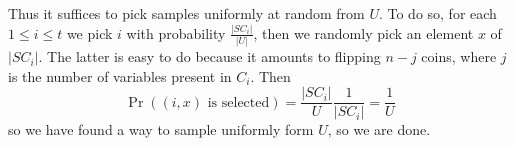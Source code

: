 Thus it suffices to pick samples uniformly at random from $U$. To do so, for each $1 \leq i \leq t$ we pick $i$ with probability $\frac{|SC_i|}{|U|}$, then we randomly pick an element $x$ of $|SC_i|$. The latter is easy to do because it amounts to flipping $n - j$ coins, where $j$ is the number of variables present in $C_i$. Then 
\[\Pr ((i, x) \mbox{ is selected}) = \frac{|SC_i|}{U} \frac{1}{|SC_i|} = \frac{1}{U}\]
so we have found a way to sample uniformly form $U$, so we are done.

